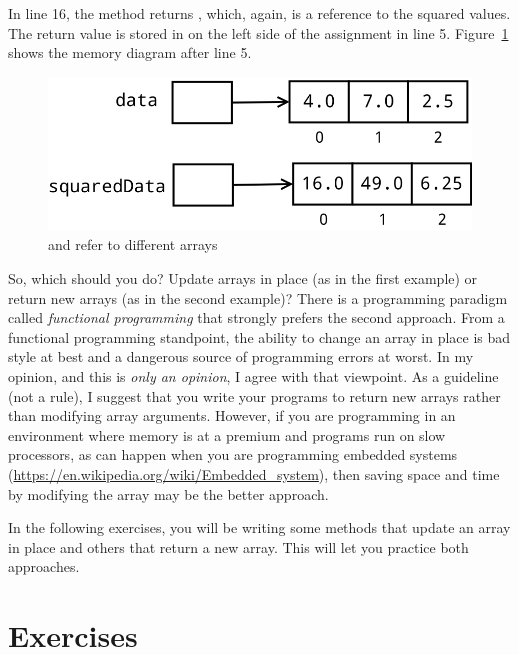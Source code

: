 In line 16, the method returns , which, again, is a reference to the squared values. The return value is stored in  on the left side of the assignment in line 5.  Figure~\ref{fig.returnArray2} shows the memory diagram after line 5.

\begin{figure}[!h]
\begin{center}
\includegraphics[scale=0.5]{figs/ch07/return_array2.png}
\caption{ and  refer to different arrays}
\label{fig.returnArray2}
\end{center}
\end{figure}

So, which should you do? Update arrays in place (as in the first example) or return new arrays (as in the second example)?  There is a programming paradigm called {\em functional programming} that strongly prefers the second approach. From a functional programming standpoint, the ability to change an array in place is bad style at best and a dangerous source of programming errors at worst. In my opinion, and this is {\em only an opinion}, I agree with that viewpoint. As a guideline (not a rule), I suggest that you write your programs to return new arrays rather than modifying array arguments. However, if you are programming in an environment where memory is at a premium and programs run on slow processors, as can happen when you are programming embedded systems (\url{https://en.wikipedia.org/wiki/Embedded_system}), then saving space and time by modifying the array may be the better approach.

In the following exercises, you will be writing some methods that update an array in place and others that return a new array. This will let you practice both approaches.

\section{Exercises}

